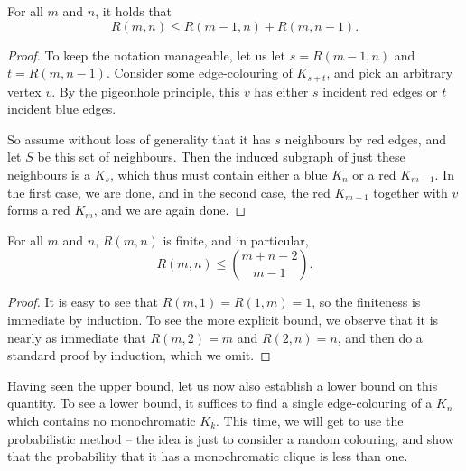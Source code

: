 \documentclass[nobib]{tufte-handout}
\begin{document}
\begin{lemma}\label{lemma:ramsey_recursion_ub}
  For all $m$ and $n$, it holds that
  $$R(m,n) \leq R(m-1,n) + R(m, n-1).$$

  \begin{proof}
    To keep the notation manageable, let us let $s = R(m-1, n)$ and $t = R(m, n-1)$. Consider some edge-colouring of $K_{s+t}$, and pick an arbitrary vertex $v$. By the pigeonhole principle, this $v$ has either $s$ incident red edges or $t$ incident blue edges.

    So assume without loss of generality that it has $s$ neighbours by red edges, and let $S$ be this set of neighbours. Then the induced subgraph of just these neighbours is a $K_s$, which thus must contain either a blue $K_n$ or a red $K_{m-1}$. In the first case, we are done, and in the second case, the red $K_{m-1}$ together with $v$ forms a red $K_m$, and we are again done.
  \end{proof}
\end{lemma}

\begin{corollary}
  For all $m$ and $n$, $R(m,n)$ is finite, and in particular,
  $$R(m,n) \leq \binom{m + n - 2}{m - 1}.$$

  \begin{proof}
    It is easy to see that $R(m,1) = R(1,m) = 1$, so the finiteness is immediate by induction. To see the more explicit bound, we observe that it is nearly as immediate that $R(m,2) = m$ and $R(2,n) = n$, and then do a standard proof by induction, which we omit.
  \end{proof}
\end{corollary}

Having seen the upper bound, let us now also establish a lower bound on this quantity. To see a lower bound, it suffices to find a single edge-colouring of a $K_n$ which contains no monochromatic $K_k$. This time, we will get to use the probabilistic method -- the idea is just to consider a random colouring, and show that the probability that it has a monochromatic clique is less than one.
\end{document}
